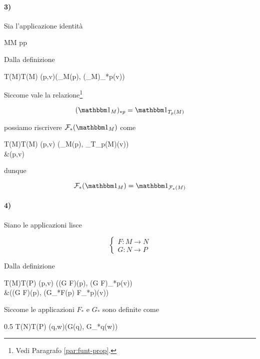 {\paragraph{3)}

Sia l'applicazione identità

	{M}{M}
	{p}{p}

Dalla definizione

	{T(M)}{T(M)}
	{(p,v)}{(\bigone_{M}(p), (\bigone_{M})_{*p}(v))}

Siccome vale la relazione\footnote{%
	Vedi Paragrafo \ref{par:funt-prop}.%
}

\begin{equation}
	(\bigone_{M})_{*p} = \bigone_{T_{p}(M)}
\end{equation}

possiamo riscrivere $ \mathcal{F}_{*}(\bigone_{M}) $ come

	{T(M)}{T(M)}
	{(p,v)}{ %
			(\bigone_{M}(p), \bigone_{T_{p}(M)}(v)) \\
			&\mapsto (p,v)
			}

dunque

\begin{equation}
	\mathcal{F}_{*}(\bigone_{M}) = \bigone_{\mathcal{F}_{*}(M)}
\end{equation}

\paragraph{4)}

Siano le applicazioni lisce

\begin{equation}
	\begin{cases}
		F : M \to N \\
		G : N \to P
	\end{cases}
\end{equation}

Dalla definizione

	{T(M)}{T(P)}
	{(p,v)}{ %
			((G \circ F)(p), (G \circ F)_{*p}(v)) \\
			&\mapsto ((G \circ F)(p), (G_{*F(p)} \circ F_{*p})(v))
			}

Siccome le applicazioni $ F_{*} $ e $ G_{*} $ sono definite come

	{0.5}{%
				{T(N)}{T(P)}
				{(q,w)}{(G(q), G_{*q}(w))}
			}

}
